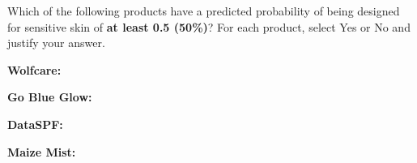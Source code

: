 \documentclass[twoside,12pt]{article}
\begin{document}
\begin{probset}
\begin{prob}[(10 pts)]
\vspace{-0.1in}



Which of the following products have a predicted probability of being designed for sensitive skin of \textbf{at least 0.5 (50\%)}? For each product, select Yes or No and justify your answer.

\begin{adjustwidth}{-0.3in}{-0.3in} %
\begin{center}
\begin{minipage}[t]{0.53\textwidth}
    \vspace{-0.1in}
    \begin{center}
    \textbf{Wolfcare:}
    \end{center}
    \vspace{-0.1in}
    \begin{responsebox}{1.6in}
        
    \end{responsebox}
\end{minipage}
\hfill
\begin{minipage}[t]{0.53\textwidth}
    \vspace{-0.1in}
    \begin{center}
    \textbf{Go Blue Glow:}
    \end{center}
    \vspace{-0.1in}
    \begin{responsebox}{1.6in}
        
    \end{responsebox}
\end{minipage}

\vspace{0.2in}

\begin{minipage}[t]{0.53\textwidth}
    \vspace{-0.1in}
    \begin{center}
    \textbf{DataSPF:}
    \end{center}
    \vspace{-0.1in}
    \begin{responsebox}{1.6in}
        
    \end{responsebox}
\end{minipage}
\hfill
\begin{minipage}[t]{0.53\textwidth}
    \vspace{-0.1in}
    \begin{center}
    \textbf{Maize Mist:}
    \end{center}
    \vspace{-0.1in}
    \begin{responsebox}{1.6in}
        

\end{responsebox}
\end{minipage}
\end{center}
\end{adjustwidth}
\end{prob}
\end{probset}
\end{document}
